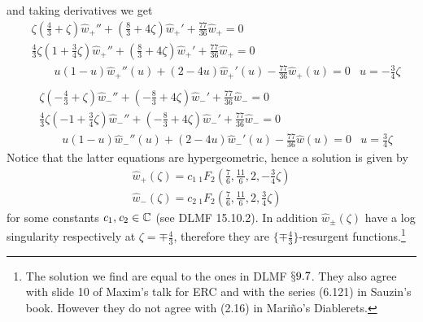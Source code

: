 \documentclass[11pt,a4paper,twoside,leqno,noamsfonts]{amsart}
\numberwithin{equation}{section}
\begin{document}
\begin{example}[Airy]
and taking derivatives we get
\begin{align*}
&\zeta(\frac{4}{3}+ \zeta)\hat{w}_{+}''+(\frac{8}{3}+4\zeta)\hat{w}_+'+\frac{77}{36}\hat{w}_{+}=0 & \\
&\frac{4}{3}\zeta( 1+ \frac{3}{4}\zeta)\hat{w}_{+}''+(\frac{8}{3}+4\zeta)\hat{w}_+'+\frac{77}{36}\hat{w}_{+}=0 & \\
&\qquad u(1-u)\hat{w}_+''(u)+(2-4u)\hat{w}_+'(u)-\frac{77}{36}\hat{w}_+(u)=0 & u=-\frac{3}{4}\zeta\\
\end{align*} 
\begin{align*}
&\zeta(-\frac{4}{3}+ \zeta)\hat{w}_{-}''+(-\frac{8}{3}+4\zeta)\hat{w}_-'+\frac{77}{36}\hat{w}_{-}=0 & \\
&\frac{4}{3}\zeta(-1+ \frac{3}{4}\zeta)\hat{w}_{-}''+(-\frac{8}{3}+4\zeta)\hat{w}_-'+\frac{77}{36}\hat{w}_{-}=0 & \\
&\qquad u(1-u)\hat{w}_-''(u)+(2-4u)\hat{w}_-'(u)-\frac{77}{36}\hat{w}(u)=0 & u=\frac{3}{4}\zeta
\end{align*} 
Notice that the latter equations are hypergeometric, hence a solution is given by 
\begin{align}
\label{hat+}\hat{w}_+(\zeta)=\mathit{c}_1 \, {}_{1}F_{2}\left(\frac{7}{6},\frac{11}{6},2,-\frac{3}{4}\zeta\right)\\
\label{hat-}\hat{w}_-(\zeta)=\mathit{c}_2 \, {}_{1}F_{2}\left(\frac{7}{6},\frac{11}{6},2,\frac{3}{4}\zeta\right)
\end{align}
for some constants $\mathit{c}_1, \mathit{c}_2\in\mathbb C$ (see DLMF 15.10.2). In addition $\hat{w}_{\pm}(\zeta)$ have a log singularity respectively at $\zeta=\mp\frac{4}{3}$, therefore they are $\lbrace\mp\frac{4}{3}\rbrace $-resurgent functions.\footnote{The solution we find are equal to the ones in DLMF $\mathsection 9.7$. They also agree with slide 10 of Maxim's talk for ERC and with the series (6.121) in Sauzin's book. However they do not agree with (2.16) in Mari\~no's Diablerets.}


\end{example}
\end{document}
